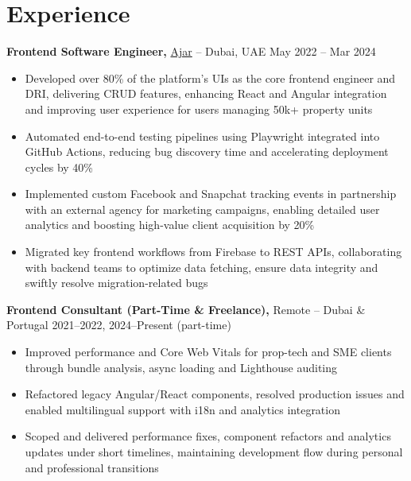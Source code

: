 \documentclass[10pt,letterpaper]{article}
\begin{document}

\section*{Experience}

\textbf{Frontend Software Engineer,} \href{https://joinajar.com/}{Ajar} -- Dubai, UAE \hfill May 2022 -- Mar 2024 \\
\vspace{-5pt}
\begin{itemize}
  \item Developed over 80\% of the platform's UIs as the core frontend engineer and DRI, delivering CRUD features, enhancing React and Angular integration and improving user experience for users managing 50k+ property units
  \item Automated end-to-end testing pipelines using Playwright integrated into GitHub Actions, reducing bug discovery time and accelerating deployment cycles by 40\%
  \item Implemented custom Facebook and Snapchat tracking events in partnership with an external agency for marketing campaigns, enabling detailed user analytics and boosting high-value client acquisition by 20\%
  \item Migrated key frontend workflows from Firebase to REST APIs, collaborating with backend teams to optimize data fetching, ensure data integrity and swiftly resolve migration-related bugs
\end{itemize}

\textbf{Frontend Consultant (Part-Time \& Freelance),} Remote -- Dubai \& Portugal \hfill 2021--2022, 2024--Present (part-time)
\vspace{-5pt}
\begin{itemize}
  \item Improved performance and Core Web Vitals for prop-tech and SME clients through bundle analysis, async loading and Lighthouse auditing
  \item Refactored legacy Angular/React components, resolved production issues and enabled multilingual support with i18n and analytics integration
  \item Scoped and delivered performance fixes, component refactors and analytics updates under short timelines, maintaining development flow during personal and professional transitions
\end{itemize}
\end{document}
